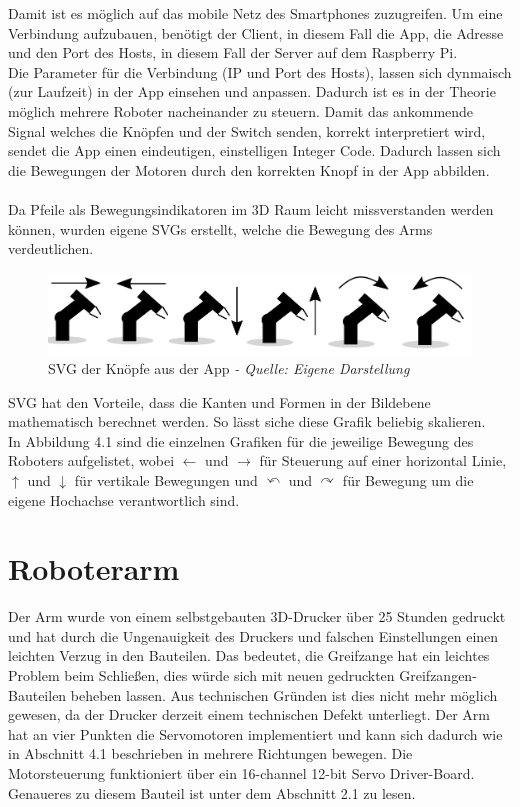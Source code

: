 \documentclass[12pt,					%
							 oneside,			%
							 a4paper,			%
							 halfparskip,		%
							 liststotoc,			%
							 bibtotoc,			%
							 fleqn,				%
							 pointlessnumbers]	%
							 {scrreprt}
\begin{document}
Damit ist es möglich auf das mobile Netz des Smartphones zuzugreifen. Um eine Verbindung aufzubauen, benötigt der Client, in diesem Fall die App, die Adresse und den Port des Hosts, in diesem Fall der Server auf dem Raspberry Pi. \\
Die Parameter für die Verbindung (IP und Port des Hosts), lassen sich dynmaisch (zur Laufzeit) in der App einsehen und anpassen. Dadurch ist es in der Theorie möglich mehrere Roboter nacheinander zu steuern. 
Damit das ankommende Signal welches die Knöpfen und der Switch senden, korrekt interpretiert wird, sendet die App einen eindeutigen, einstelligen Integer Code. Dadurch lassen sich die Bewegungen der Motoren durch den korrekten Knopf in der App abbilden. \\ \\
Da Pfeile als Bewegungsindikatoren im 3D Raum leicht missverstanden werden können, wurden eigene SVGs erstellt, welche die Bewegung des Arms verdeutlichen. 
\begin{figure}[h]
	\centering
	\includegraphics[scale=0.3]{pictures/robissvg.jpg}
	\caption{SVG der Knöpfe aus der App \textit{- Quelle: Eigene Darstellung}}
\end{figure}
\newpage
SVG hat den Vorteile, dass die Kanten und Formen in der Bildebene mathematisch berechnet werden. So lässt siche diese Grafik beliebig skalieren. \\
In Abbildung 4.1 sind die einzelnen Grafiken für die jeweilige Bewegung des Roboters aufgelistet, wobei $\leftarrow$ und $\rightarrow$ für Steuerung auf einer horizontal Linie, $\uparrow$ und $\downarrow$ für vertikale Bewegungen und $\curvearrowleft$ und $\curvearrowright$ für Bewegung um die eigene Hochachse verantwortlich sind.

\section{Roboterarm}
Der Arm wurde von einem selbstgebauten 3D-Drucker über 25 Stunden gedruckt und hat durch die Ungenauigkeit des Druckers und falschen Einstellungen einen leichten Verzug in den Bauteilen. Das bedeutet, die Greifzange hat ein leichtes Problem beim Schließen, dies würde sich mit neuen gedruckten Greifzangen-Bauteilen beheben lassen. Aus technischen Gründen ist dies nicht mehr möglich gewesen, da der Drucker derzeit einem technischen Defekt unterliegt.
Der Arm hat an vier Punkten die Servomotoren implementiert und kann sich dadurch wie in Abschnitt 4.1 beschrieben in mehrere Richtungen bewegen. Die Motorsteuerung funktioniert über ein 16-channel 12-bit Servo Driver-Board. Genaueres zu diesem Bauteil ist unter dem Abschnitt 2.1 zu lesen.
\newpage
\end{document}
